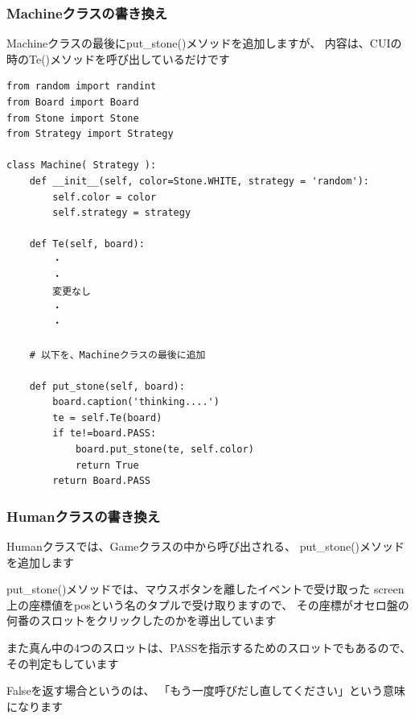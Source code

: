 \documentclass[uplatex,a4paper,11pt,oneside,openany]{jsbook}
\begin{document}
\subsubsection{Machineクラスの書き換え}

Machineクラスの最後にput\_stone()メソッドを追加しますが、
内容は、CUIの時のTe()メソッドを呼び出しているだけです

\begin{lstlisting}[caption=Machine class,label=othello10]
from random import randint
from Board import Board
from Stone import Stone
from Strategy import Strategy

class Machine( Strategy ):
    def __init__(self, color=Stone.WHITE, strategy = 'random'):
        self.color = color
        self.strategy = strategy

    def Te(self, board):
        ・
        ・
        変更なし
        ・
        ・

    # 以下を、Machineクラスの最後に追加

    def put_stone(self, board):
        board.caption('thinking....')
        te = self.Te(board)
        if te!=board.PASS:
            board.put_stone(te, self.color)
            return True
        return Board.PASS
\end{lstlisting}

\subsubsection{Humanクラスの書き換え}

Humanクラスでは、Gameクラスの中から呼び出される、
put\_stone()メソッドを追加します

put\_stone()メソッドでは、マウスボタンを離したイベントで受け取った
screen上の座標値をposという名のタプルで受け取りますので、
その座標がオセロ盤の何番のスロットをクリックしたのかを導出しています

また真ん中の4つのスロットは、PASSを指示するためのスロットでもあるので、
その判定もしています

Falseを返す場合というのは、
「もう一度呼びだし直してください」という意味になります
\end{document}
